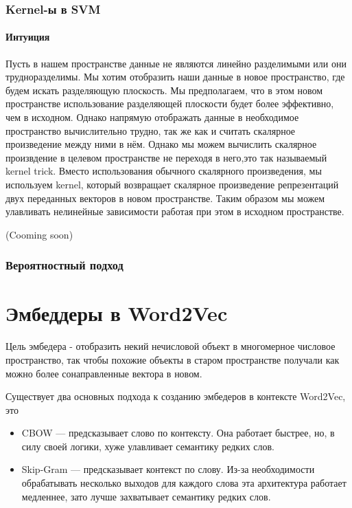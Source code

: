 \documentclass{article}
\begin{document}
    \subsubsection{Kernel-ы в SVM}

    \paragraph{Интуиция}

    \quad 

    Пусть в нашем пространстве данные не являются линейно разделимыми или они трудноразделимы.
    Мы хотим отобразить наши данные в новое пространство, где будем искать разделяющую плоскость.
    Мы предполагаем, что в этом новом пространстве использование разделяющей плоскости
    будет более эффективно, чем в исходном.
    Однако напрямую отображать данные в необходимое пространство вычислительно трудно,
    так же как и считать скалярное произведение между ними в нём. Однако мы можем 
    вычислить скалярное произвдение в целевом пространстве не переходя в него,это так называемый kernel trick.
    Вместо использования обычного скалярного произведения, мы используем kernel, который возвращает скалярное
    произведение репрезентаций двух переданных векторов в новом пространстве. Таким образом мы можем улавливать нелинейные 
    зависимости работая при этом в исходном пространстве. 

    \quad 

    (Cooming soon)

    \quad

    \subsubsection{Вероятностный подход}



    \section{Эмбеддеры в Word2Vec}
    Цель эмбедера - отобразить некий нечисловой объект в многомерное числовое пространство, так чтобы похожие 
    объекты в старом пространстве получали как можно более сонаправленные вектора в новом. 

    Существует два основных подхода к созданию эмбедеров в контексте Word2Vec, это 
    \begin{itemize}
        \item CBOW --- предсказывает слово по контексту. 
        Она работает быстрее, но, в силу своей логики, хуже улавливает семантику редких слов.
        \item Skip-Gram --- предсказывает контекст по слову. 
        Из-за необходимости обрабатывать несколько выходов для каждого слова 
        эта архитектура работает медленнее, зато лучше захватывает семантику редких слов.  
    \end{itemize}
    
\end{document}
